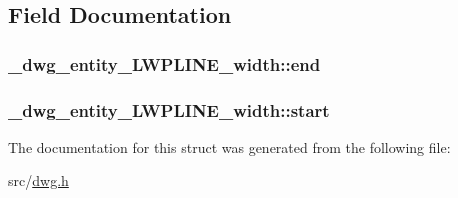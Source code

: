 \subsection{\-Field \-Documentation}
\hypertarget{struct__dwg__entity__LWPLINE__width_a2d240765585d8e4bc8b73b6109ba1c40}{
\subsubsection[{end}]{ {\bf \-\_\-dwg\-\_\-entity\-\_\-\-L\-W\-P\-L\-I\-N\-E\-\_\-width\-::end}}}\label{struct__dwg__entity__LWPLINE__width_a2d240765585d8e4bc8b73b6109ba1c40}
\hypertarget{struct__dwg__entity__LWPLINE__width_a2904492879b1befb6c85bff743920ee5}{
\subsubsection[{start}]{ {\bf \-\_\-dwg\-\_\-entity\-\_\-\-L\-W\-P\-L\-I\-N\-E\-\_\-width\-::start}}}\label{struct__dwg__entity__LWPLINE__width_a2904492879b1befb6c85bff743920ee5}


\-The documentation for this struct was generated from the following file\-:\begin{DoxyCompactItemize}
\item 
src/\hyperlink{dwg_8h}{dwg.\-h}\end{DoxyCompactItemize}
